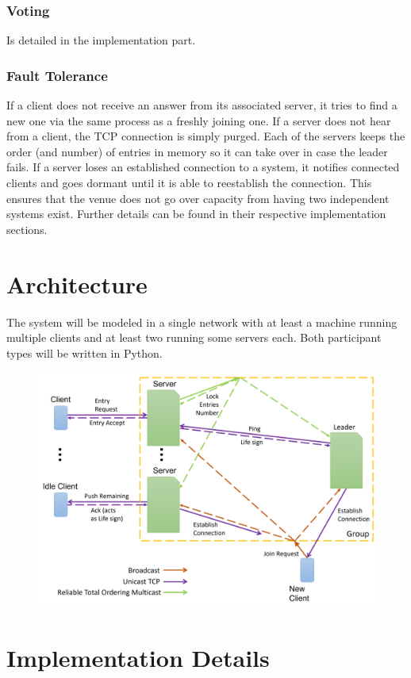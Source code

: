\documentclass[runningheads]{llncs}
\begin{document}
\subsubsection{Voting}
Is detailed in the implementation part.

\subsubsection{Fault Tolerance}
If a client does not receive an answer from its associated server, it tries to find a new one via the same process as a freshly joining one.
If a server does not hear from a client, the TCP connection is simply purged.
Each of the servers keeps the order (and number) of entries in memory so it can take over in case the leader fails.
If a server loses an established connection to a system, it notifies connected clients and goes dormant until it is able to reestablish the connection.
This ensures that the venue does not go over capacity from having two independent systems exist.
Further details can be found in their respective implementation sections.

\section{Architecture}
The system will be modeled in a single network with at least a machine running multiple clients and at least two running some servers each.
Both participant types will be written in Python.\\
\begin{figure}
\includegraphics[width=\textwidth]{Architecture_Diagram.png}
\end{figure}

\section{Implementation Details}






\end{document}
